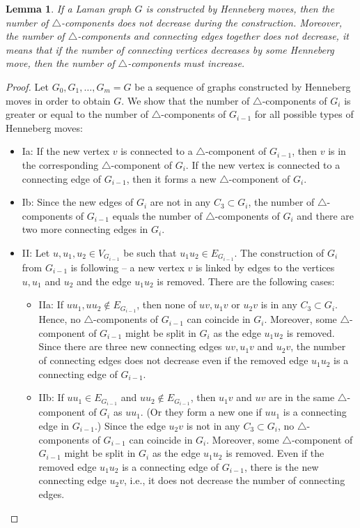 \documentclass[a4paper, 11pt]{article}
\newcommand{\trcomp}{$\triangle$-component}
\newcommand{\trcomps}{$\triangle$-components}
\newtheorem{lem}[thm]{Lemma}
\theoremstyle{definition}
\begin{document}
\begin{lem}
\label{lem:trcompsCannotBeLinked}
If a Laman graph $G$ is constructed by Henneberg moves, then the number of \trcomps{} does not decrease during the construction. Moreover, the number of \trcomps{} and connecting edges together does not decrease, it means that if the number of connecting vertices decreases by some Henneberg move, then the number of \trcomps{} must increase.
\end{lem}
\begin{proof}
Let  $G_0, G_1, \dots, G_m=G$ be a sequence of graphs constructed by Henneberg moves in order to obtain $G$.
We show that the number of \trcomps{} of $G_{i}$ is greater or equal to the number of \trcomps{} of $G_{i-1}$ for all possible types of Henneberg moves:
\begin{itemize}
	\item Ia: If the new vertex $v$ is connected to a \trcomp{} of $G_{i-1}$, then $v$ is in the corresponding \trcomp{} of $G_i$. If the new vertex is connected to a connecting edge of $G_{i-1}$, then it forms a new \trcomp{} of $G_i$.
	\item Ib: Since the new edges of $G_i$ are not in any $C_3\subset G_i$, the number of \trcomps{} of $G_{i-1}$ equals the number of \trcomps{} of $G_{i}$ and there are two more connecting edges in $G_i$.
	\item II: Let $u,u_1,u_2\in V_{G_{i-1}}$ be such that $u_1u_2\in E_{G_{i-1}}$. The construction of $G_i$ from $G_{i-1}$ is following -- a new vertex $v$ is linked by edges to the vertices $u,u_1$ and $u_2$ and the edge $u_1u_2$ is removed. There are the following cases:
	\begin{itemize}
		\item IIa: If $uu_1, uu_2\notin E_{G_{i-1}}$, then none of $uv, u_1v$ or $u_2v$ is in any $C_3\subset G_i$. Hence, no \trcomps{} of $G_{i-1}$ can coincide in $G_i$. Moreover, some \trcomp{} of $G_{i-1}$ might be split in $G_{i}$ as the edge $u_1u_2$ is removed. Since there are three new connecting edges $uv, u_1v$ and $u_2v$, the number of connecting edges does not decrease even if the removed edge $u_1u_2$ is a connecting edge of $G_{i-1}$.
		\item IIb: If $uu_1\in E_{G_{i-1}}$ and $uu_2\notin E_{G_{i-1}}$, then $u_1v$ and $uv$ are in the same \trcomp{} of $G_i$ as $uu_1$. (Or they form a new one if $uu_1$ is a connecting edge in $G_{i-1}$.) Since the edge $u_2v$ is not in any $C_3\subset G_i$, no \trcomps{} of $G_{i-1}$ can coincide in $G_i$. Moreover, some \trcomp{} of $G_{i-1}$ might be split in $G_{i}$ as the edge $u_1u_2$ is removed. Even if the removed edge $u_1u_2$ is a connecting edge of $G_{i-1}$, there is the new connecting edge $u_2v$, i.e., it does not decrease the number of connecting edges.

\end{itemize}
\end{itemize}
\end{proof}
\end{document}
